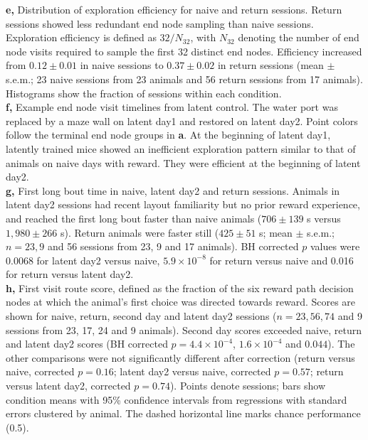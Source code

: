 \documentclass[fleqn,10pt]{wlscirep}
\makeatletter
\newcommand{\labeltoimage}[1]{%
  \begingroup
  \edef\@currentHref{\csname imagehref@#1\endcsname}%
  \label{#1}%
  \endgroup
}
\makeatother
\begin{document}
{\textbf{e,} Distribution of exploration efficiency for naive and return sessions. Return sessions showed less redundant end node sampling than naive sessions. Exploration efficiency is defined as $32/N_{32}$, with $N_{32}$ denoting the number of end node visits required to sample the first 32 distinct end nodes. Efficiency increased from $0.12\pm0.01$ in naive sessions to $0.37\pm0.02$ in return sessions (mean $\pm$ s.e.m.; 23 naive sessions from 23 animals and 56 return sessions from 17 animals). Histograms show the fraction of sessions within each condition. \\
\textbf{f,} Example end node visit timelines from latent control. The water port was replaced by a maze wall on latent day1 and restored on latent day2. Point colors follow the terminal end node groups in \textbf{a}. At the beginning of latent day1, latently trained mice showed an inefficient exploration pattern similar to that of animals on naive days with reward. They were efficient at the beginning of latent day2.\\
\textbf{g,} First long bout time in naive, latent day2 and return sessions. Animals in latent day2 sessions had recent layout familiarity but no prior reward experience, and reached the first long bout faster than naive animals ($706\pm139$ s versus $1{,}980\pm266$ s). Return animals were faster still ($425\pm51$ s; mean $\pm$ s.e.m.; $n=23,9$ and 56 sessions from 23, 9 and 17 animals). BH corrected $p$ values were 0.0068 for latent day2 versus naive, $5.9\times10^{-8}$ for return versus naive and 0.016 for return versus latent day2.\\
\textbf{h,} First visit route score, defined as the fraction of the six reward path decision nodes at which the animal’s first choice was directed towards reward. Scores are shown for naive, return, second day and latent day2 sessions ($n=23,56,74$ and 9 sessions from 23, 17, 24 and 9 animals). Second day scores exceeded naive, return and latent day2 scores (BH corrected $p=4.4\times10^{-4}$, $1.6\times10^{-4}$ and $0.044$). The other comparisons were not significantly different after correction (return versus naive, corrected $p=0.16$; latent day2 versus naive, corrected $p=0.57$; return versus latent day2, corrected $p=0.74$). Points denote sessions; bars show condition means with 95\% confidence intervals from regressions with standard errors clustered by animal. The dashed horizontal line marks chance performance (0.5).
}
\labeltoimage{fig:figure1}

\clearpage
\end{document}
